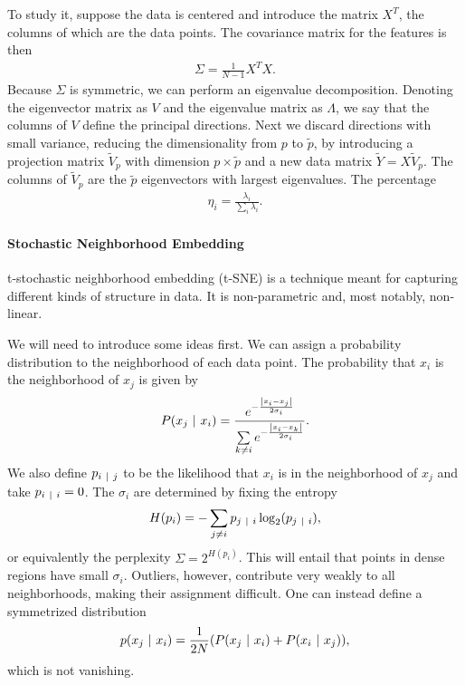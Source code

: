 To study it, suppose the data is centered and introduce the matrix $X^{T}$, the columns of which are the data points. The covariance matrix for the features is then
\begin{align*}
	\Sigma = \frac{1}{N - 1}X^{T}X.
\end{align*}
Because $\Sigma$ is symmetric, we can perform an eigenvalue decomposition. Denoting the eigenvector matrix as $V$ and the eigenvalue matrix as $\Lambda$, we say that the columns of $V$ define the principal directions. Next we discard directions with small variance, reducing the dimensionality from $p$ to $\tilde{p}$, by introducing a projection matrix $\tilde{V}_{p}$ with dimension $p\times\tilde{p}$ and a new data matrix $\tilde{Y} = X\tilde{V}_{p}$. The columns of $\tilde{V}_{p}$ are the $\tilde{p}$ eigenvectors with largest eigenvalues. The percentage
\begin{align*}
	\eta_{i} = \frac{\lambda_{i}}{\sum\limits_{i}\lambda_{i}}.
\end{align*}

\paragraph{Stochastic Neighborhood Embedding}
t-stochastic neighborhood embedding (t-SNE) is a technique meant for capturing different kinds of structure in data. It is non-parametric and, most notably, non-linear.

We will need to introduce some ideas first. We can assign a probability distribution to the neighborhood of each data point. The probability that $x_{i}$ is the neighborhood of $x_{j}$ is given by
\begin{align*}
	P(x_{j}\ \vert\  x_{i}) = \frac{e^{-\frac{\abs{x_{i} - x_{j}}}{2\sigma_{i}}}}{\sum\limits_{k\neq i}e^{-\frac{\abs{x_{i} - x_{k}}}{2\sigma_{i}}}}.
\end{align*}
We also define $p_{i\ \vert\  j}$ to be the likelihood that $x_{i}$ is in the neighborhood of $x_{j}$ and take $p_{i\ \vert\  i} = 0$. The $\sigma_{i}$ are determined by fixing the entropy
\begin{align*}
	H(p_{i}) = -\sum\limits_{j\neq i}p_{j\ \vert\  i}\log_{2}(p_{j\ \vert\  i}),
\end{align*}
or equivalently the perplexity $\Sigma = 2^{H(p_{i})}$. This will entail that points in dense regions have small $\sigma_{i}$. Outliers, however, contribute very weakly to all neighborhoods, making their assignment difficult. One can instead define a symmetrized distribution
\begin{align*}
	p(x_{j}\ \vert\  x_{i}) = \frac{1}{2N}(P(x_{j}\ \vert\  x_{i}) + P(x_{i}\ \vert\  x_{j})),
\end{align*}
which is not vanishing.

